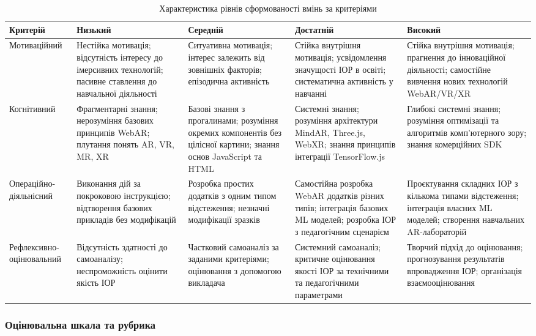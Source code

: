 \begin{table}[!h]
\centering
\caption{Характеристика рівнів сформованості вмінь за критеріями}
\label{tab:criteria_levels_ier}
\small
\begin{tabularx}{\linewidth}{|p{2cm}|p{3.2cm}|p{3cm}|p{3.4cm}|X|}
\hline
\hfil \textbf{Критерій} & \hfil \textbf{Низький} & \hfil \textbf{Середній} & \hfil \textbf{Достатній} & \hfil \textbf{Високий} \\
\hline
Мотива\-ційний &
Нестійка мотивація; відсутність інтересу до імерсивних технологій; пасивне ставлення до навчальної діяльності &
Ситуативна мотивація; інтерес залежить від зовнішніх факторів; епізодична активність &
Стійка внутрішня мотивація; усвідомлення значущості ІОР в освіті; систематична активність у навчанні &
Стійка внутрішня мотивація; прагнення до інноваційної діяльності; самостійне вивчення нових технологій WebAR/VR/XR \\
\hline
Когні\-тивний &
Фрагментарні знання; нерозуміння базових принципів WebAR; плутання понять AR, VR, MR, XR &
Базові знання з прогалинами; розуміння окремих компонентів без цілісної картини; знання основ JavaScript та HTML &
Системні знання; розуміння архітектури MindAR, Three.js, WebXR; знання принципів інтеграції TensorFlow.js &
Глибокі системні знання; розуміння оптимізації та алгоритмів комп'ютерного зору; знання комерційних SDK \\
\hline
Опера\-ційно-діяль\-нісний &
Виконання дій за покроковою інструкцією; відтворення базових прикладів без модифікацій &
Розробка простих додатків з одним типом відстеження; незначні модифікації зразків &
Самостійна розробка WebAR додатків різних типів; інтеграція базових ML моделей; розробка ІОР з педагогічним сценарієм &
Проєктування складних ІОР з кількома типами відстеження; інтеграція власних ML моделей; створення навчальних AR-лабораторій \\
\hline
Рефлек\-сивно-оціню\-вальний &
Відсутність здатності до самоаналізу; неспроможність оцінити якість ІОР &
Частковий самоаналіз за заданими критеріями; оцінювання з допомогою викладача &
Системний самоаналіз; критичне оцінювання якості ІОР за технічними та педагогічними параметрами &
Творчий підхід до оцінювання; прогнозування результатів впровадження ІОР; організація взаємо\-оцінювання \\
\hline
\end{tabularx}
\end{table}

\subsubsection{Оцінювальна шкала та рубрика}

